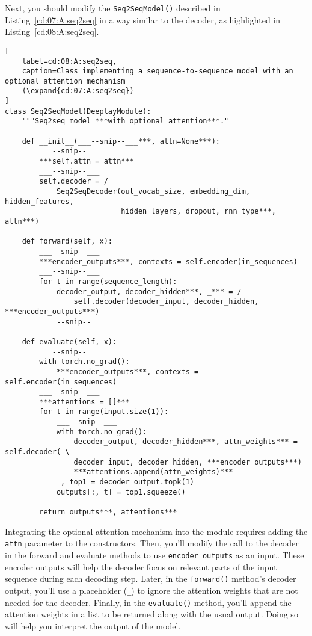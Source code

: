 Next, you should modify the \lstinline{Seq2SeqModel()} described in Listing~\ref{cd:07:A:seq2seq} in a way similar to the decoder, as highlighted in Listing~\ref{cd:08:A:seq2seq}.
\begin{lstlisting}[
    label=cd:08:A:seq2seq,
    caption=Class implementing a sequence-to-sequence model with an optional attention mechanism
    (\expand{cd:07:A:seq2seq})
]
class Seq2SeqModel(DeeplayModule):
    """Seq2seq model ***with optional attention***."

    def __init__(___--snip--___***, attn=None***):
        ___--snip--___
        ***self.attn = attn*** 
        ___--snip--___
        self.decoder = /
            Seq2SeqDecoder(out_vocab_size, embedding_dim, hidden_features,
                           hidden_layers, dropout, rnn_type***, attn***)

    def forward(self, x):
        ___--snip--___
        ***encoder_outputs***, contexts = self.encoder(in_sequences)
        ___--snip--___
        for t in range(sequence_length):
            decoder_output, decoder_hidden***, _*** = /
                self.decoder(decoder_input, decoder_hidden, ***encoder_outputs***)
         ___--snip--___

    def evaluate(self, x):
        ___--snip--___
        with torch.no_grad():
            ***encoder_outputs***, contexts = self.encoder(in_sequences)
        ___--snip--___
        ***attentions = []***
        for t in range(input.size(1)):
            ___--snip--___
            with torch.no_grad():
                decoder_output, decoder_hidden***, attn_weights*** = self.decoder( \
                decoder_input, decoder_hidden, ***encoder_outputs***)
                ***attentions.append(attn_weights)***
            _, top1 = decoder_output.topk(1)
            outputs[:, t] = top1.squeeze()

        return outputs***, attentions***
\end{lstlisting}
Integrating the optional attention mechanism into the module requires adding the \lstinline{attn} parameter to the constructors. Then, you'll modify the call to the decoder in the forward and evaluate methods to use \lstinline{encoder_outputs} as an input. These encoder outputs will help the decoder focus on relevant parts of the input sequence during each decoding step. Later, in the \lstinline{forward()} method's decoder output, you'll use a placeholder (\lstinline{_}) to ignore the attention weights that are not needed for the decoder. Finally, in the \lstinline{evaluate()} method, you'll append the attention weights in a list to be returned along with the usual output. Doing so will help you interpret the output of the model.

